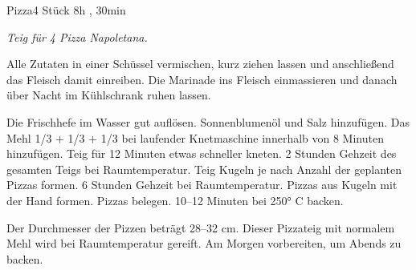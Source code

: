 \documentclass[../recipe-collections/cooking.tex]{subfiles}
\begin{document}
\begin{recipe}{Pizza}{4 Stück }{8h , 30min }

  \freeform{}\textit{Teig für 4 Pizza Napoletana.}


  Alle Zutaten in einer Schüssel vermischen, kurz ziehen lassen und anschließend das Fleisch damit einreiben.
  Die Marinade ins Fleisch einmassieren und danach über Nacht im Kühlschrank ruhen lassen.


  Die Frischhefe im Wasser gut auflösen.
  Sonnenblumenöl und Salz hinzufügen.
  Das Mehl 1/3 + 1/3 + 1/3 bei laufender Knetmaschine innerhalb von 8 Minuten hinzufügen.
  Teig für 12 Minuten etwas schneller kneten.
  2 Stunden Gehzeit des gesamten Teigs bei Raumtemperatur.
  Teig Kugeln je nach Anzahl der geplanten Pizzas formen.
  6 Stunden Gehzeit bei Raumtemperatur.
  Pizzas aus Kugeln mit der Hand formen.
  Pizzas belegen.
  10–12 Minuten bei 250° C backen.

  \freeform{}\hrulefill{}

  \freeform{}
  Der Durchmesser der Pizzen beträgt 28–32 cm.
  Dieser Pizzateig mit normalem Mehl wird bei Raumtemperatur gereift.
  Am Morgen vorbereiten, um Abends zu backen.

\end{recipe}
\end{document}
